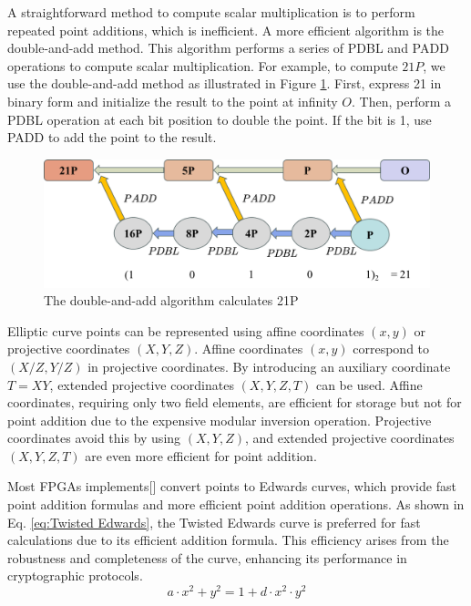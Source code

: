 \documentclass[conference]{IEEEtran}
\begin{document}
A straightforward method to compute scalar multiplication is to perform repeated point additions, which is inefficient. A more efficient algorithm is the double-and-add method. This algorithm performs a series of PDBL and PADD operations to compute scalar multiplication. For example, to compute \( 21P \), we use the double-and-add method as illustrated in Figure \ref{fig:double-add}. First, express 21 in binary form and initialize the result to the point at infinity \( O \). Then, perform a PDBL operation at each bit position to double the point. If the bit is 1, use PADD to add the point to the result.

\begin{figure}[h]
\centering
\includegraphics[width=1\linewidth]{image/double-and-add.png}
\caption{The double-and-add algorithm calculates 21P}
\label{fig:double-add}
\end{figure}

Elliptic curve points can be represented using affine coordinates $(x, y)$ or projective coordinates $(X, Y, Z)$. Affine coordinates $(x, y)$ correspond to $(X / Z, Y / Z)$ in projective coordinates. By introducing an auxiliary coordinate $T = XY$, extended projective coordinates $(X, Y, Z, T)$ can be used. Affine coordinates, requiring only two field elements, are efficient for storage but not for point addition due to the expensive modular inversion operation. Projective coordinates avoid this by using $(X, Y, Z)$, and extended projective coordinates $(X, Y, Z, T)$ are even more efficient for point addition.

Most FPGAs implements[] convert points to Edwards curves, which provide fast point addition formulas and more efficient point addition operations. As shown in Eq. \ref{eq:Twisted Edwards}, the Twisted Edwards curve is preferred for fast calculations due to its efficient addition formula. This efficiency arises from the robustness and completeness of the curve, enhancing its performance in cryptographic protocols.
\begin{equation}
a \cdot x^2+y^2=1+d \cdot x^2 \cdot y^2
\label{eq:Twisted Edwards}
\end{equation}
\end{document}
